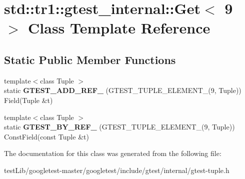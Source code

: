 \hypertarget{classstd_1_1tr1_1_1gtest__internal_1_1Get_3_019_01_4}{}\section{std\+:\+:tr1\+:\+:gtest\+\_\+internal\+:\+:Get$<$ 9 $>$ Class Template Reference}
\label{classstd_1_1tr1_1_1gtest__internal_1_1Get_3_019_01_4}
\subsection*{Static Public Member Functions}
\begin{DoxyCompactItemize}
\item 
\mbox{\label{classstd_1_1tr1_1_1gtest__internal_1_1Get_3_019_01_4_add31197dfdb381d265e221ed62129f45}} 
{\footnotesize template$<$class Tuple $>$ }\\static {\bfseries G\+T\+E\+S\+T\+\_\+\+A\+D\+D\+\_\+\+R\+E\+F\+\_\+} (G\+T\+E\+S\+T\+\_\+\+T\+U\+P\+L\+E\+\_\+\+E\+L\+E\+M\+E\+N\+T\+\_\+(9, Tuple)) Field(Tuple \&t)
\item 
\mbox{\label{classstd_1_1tr1_1_1gtest__internal_1_1Get_3_019_01_4_a5205e8da729e2bee446f5be0c65390af}} 
{\footnotesize template$<$class Tuple $>$ }\\static {\bfseries G\+T\+E\+S\+T\+\_\+\+B\+Y\+\_\+\+R\+E\+F\+\_\+} (G\+T\+E\+S\+T\+\_\+\+T\+U\+P\+L\+E\+\_\+\+E\+L\+E\+M\+E\+N\+T\+\_\+(9, Tuple)) Const\+Field(const Tuple \&t)
\end{DoxyCompactItemize}


The documentation for this class was generated from the following file\+:\begin{DoxyCompactItemize}
\item 
test\+Lib/googletest-\/master/googletest/include/gtest/internal/gtest-\/tuple.\+h\end{DoxyCompactItemize}

